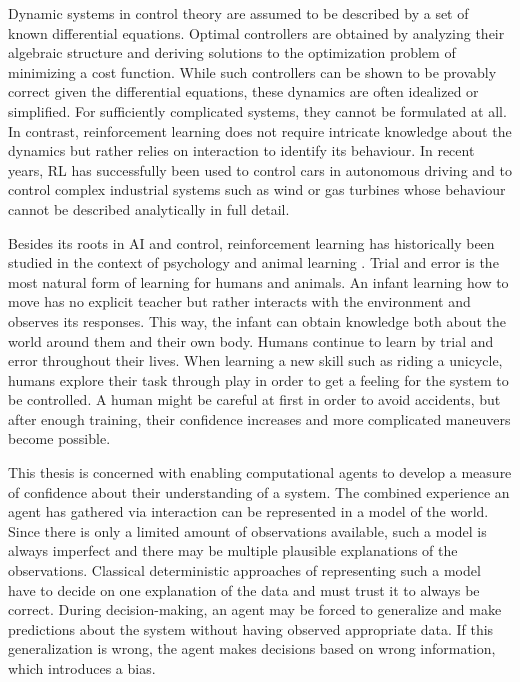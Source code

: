 Dynamic systems in control theory are assumed to be described by a set of known differential equations.
Optimal controllers are obtained by analyzing their algebraic structure and deriving solutions to the optimization problem of minimizing a cost function.
While such controllers can be shown to be provably correct given the differential equations, these dynamics are often idealized or simplified.
For sufficiently complicated systems, they cannot be formulated at all.
In contrast, reinforcement learning does not require intricate knowledge about the dynamics but rather relies on interaction to identify its behaviour.
In recent years, RL has successfully been used to control cars in autonomous driving \cite{kolter_probabilistic_2010} and to control complex industrial systems such as wind or gas turbines \cite{siemens_citation} whose behaviour cannot be described analytically in full detail.

Besides its roots in AI and control, reinforcement learning has historically been studied in the context of psychology and animal learning \cite{sutton_reinforcement_1998}.
Trial and error is the most natural form of learning for humans and animals.
An infant learning how to move has no explicit teacher but rather interacts with the environment and observes its responses.
This way, the infant can obtain knowledge both about the world around them and their own body.
Humans continue to learn by trial and error throughout their lives.
When learning a new skill such as riding a unicycle, humans explore their task through play in order to get a feeling for the system to be controlled.
A human might be careful at first in order to avoid accidents, but after enough training, their confidence increases and more complicated maneuvers become possible.

This thesis is concerned with enabling computational agents to develop a measure of confidence about their understanding of a system.
The combined experience an agent has gathered via interaction can be represented in a model of the world.
Since there is only a limited amount of observations available, such a model is always imperfect and there may be multiple plausible explanations of the observations.
Classical deterministic approaches of representing such a model have to decide on one explanation of the data and must trust it to always be correct.
During decision-making, an agent may be forced to generalize and make predictions about the system without having observed appropriate data.
If this generalization is wrong, the agent makes decisions based on wrong information, which introduces a bias.

